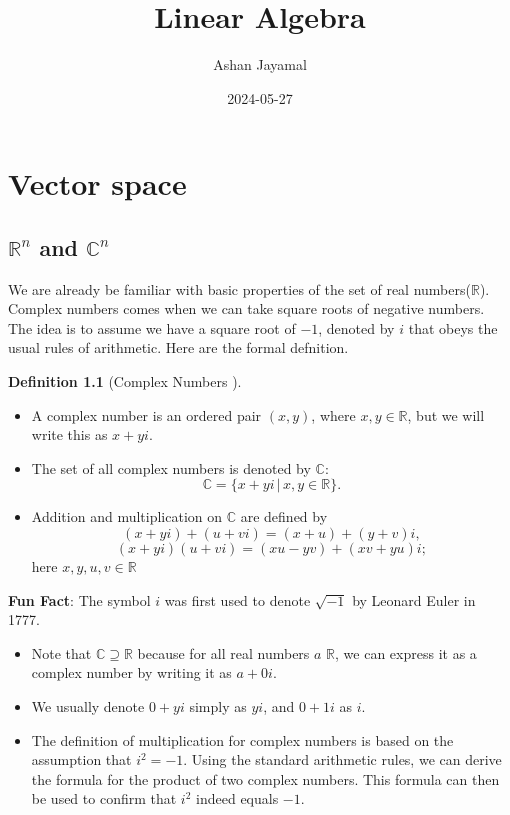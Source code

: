 \documentclass[
]{book}
\title{Linear Algebra}
\author{Ashan Jayamal}
\date{2024-05-27}
\providecommand{\tightlist}{%
  \setlength{\itemsep}{0pt}\setlength{\parskip}{0pt}}
\theoremstyle{definition}
\newtheorem{definition}{Definition}[chapter]
\theoremstyle{definition}
\theoremstyle{definition}
\theoremstyle{definition}
\theoremstyle{remark}
\begin{document}
\maketitle

{
\setcounter{tocdepth}{1}
\tableofcontents
}
\chapter{Vector space}\label{vector-space}

\section{\texorpdfstring{\(\mathbb{R}^n\) and \(\mathbb{C}^n\)}{\textbackslash mathbb\{R\}\^{}n and \textbackslash mathbb\{C\}\^{}n}}\label{mathbbrn-and-mathbbcn}

We are already be familiar with basic properties of the set of real numbers(\(\mathbb{R}\)). Complex numbers comes when we can take square roots of negative numbers. The idea is to assume we have a square root of \(−1\), denoted by \(i\) that obeys the usual rules of arithmetic. Here are the formal defnition.

\begin{definition}[Complex Numbers ]
\protect\hypertarget{def:unnamed-chunk-1}{}\label{def:unnamed-chunk-1}\leavevmode

\begin{itemize}
\tightlist
\item
  A complex number is an ordered pair \((x, y)\), where \(x, y \in \mathbb{R}\), but we will write this as \(x + yi\).
\item
  The set of all complex numbers is denoted by \(\mathbb{C}\):
  \[\mathbb{C} = \{x + yi \,|\, x, y \in \mathbb{R}\}.\]
\item
  Addition and multiplication on \(\mathbb{C}\) are defined by
  \[(x + yi) + (u + vi) = (x + u) + (y + v)i,\]
  \[(x + yi)(u + vi) = (xu - yv) + (xv + yu)i;\]
  here \(x, y, u, v \in \mathbb{R}\)
\end{itemize}

\end{definition}

\textbf{Fun Fact}: The symbol \(i\) was first used to denote \(\sqrt{-1}\) by Leonard Euler in 1777.

\begin{itemize}
\tightlist
\item
  Note that \(\mathbb{C} \supseteq \mathbb{R}\) because for all real numbers \(a\) \(\mathbb{R}\), we can express it as a complex number by writing it as \(a + 0i\).
\item
  We usually denote \(0 + yi\) simply as \(yi\), and \(0 + 1i\) as \(i\).
\item
  The definition of multiplication for complex numbers is based on the assumption that \(i^2 = -1\). Using the standard arithmetic rules, we can derive the formula for the product of two complex numbers. This formula can then be used to confirm that \(i^2\) indeed equals \(-1\).
\end{itemize}
\end{document}
